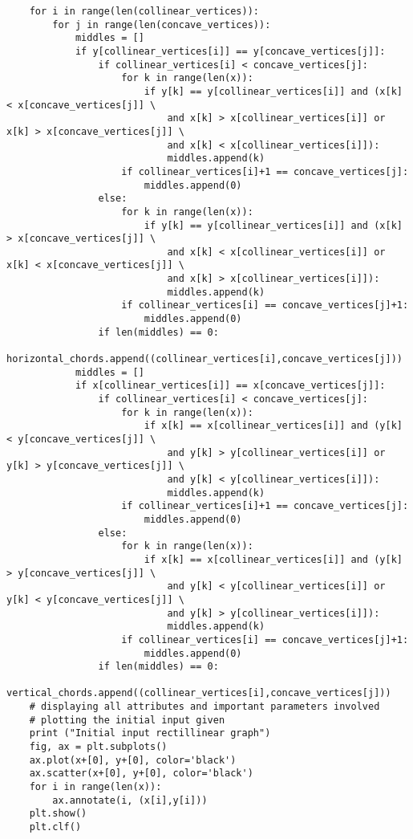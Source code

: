 \begin{lstlisting}
    for i in range(len(collinear_vertices)):
        for j in range(len(concave_vertices)):
            middles = []
            if y[collinear_vertices[i]] == y[concave_vertices[j]]:
                if collinear_vertices[i] < concave_vertices[j]:
                    for k in range(len(x)):
                        if y[k] == y[collinear_vertices[i]] and (x[k] < x[concave_vertices[j]] \
                            and x[k] > x[collinear_vertices[i]] or x[k] > x[concave_vertices[j]] \
                            and x[k] < x[collinear_vertices[i]]):
                            middles.append(k)
                    if collinear_vertices[i]+1 == concave_vertices[j]:
                        middles.append(0)
                else:
                    for k in range(len(x)):
                        if y[k] == y[collinear_vertices[i]] and (x[k] > x[concave_vertices[j]] \
                            and x[k] < x[collinear_vertices[i]] or x[k] < x[concave_vertices[j]] \
                            and x[k] > x[collinear_vertices[i]]):
                            middles.append(k)
                    if collinear_vertices[i] == concave_vertices[j]+1:
                        middles.append(0)
                if len(middles) == 0:
                    horizontal_chords.append((collinear_vertices[i],concave_vertices[j]))
            middles = []
            if x[collinear_vertices[i]] == x[concave_vertices[j]]:
                if collinear_vertices[i] < concave_vertices[j]:
                    for k in range(len(x)):
                        if x[k] == x[collinear_vertices[i]] and (y[k] < y[concave_vertices[j]] \
                            and y[k] > y[collinear_vertices[i]] or y[k] > y[concave_vertices[j]] \
                            and y[k] < y[collinear_vertices[i]]):
                            middles.append(k)
                    if collinear_vertices[i]+1 == concave_vertices[j]:
                        middles.append(0)
                else:
                    for k in range(len(x)):
                        if x[k] == x[collinear_vertices[i]] and (y[k] > y[concave_vertices[j]] \
                            and y[k] < y[collinear_vertices[i]] or y[k] < y[concave_vertices[j]] \
                            and y[k] > y[collinear_vertices[i]]):
                            middles.append(k)
                    if collinear_vertices[i] == concave_vertices[j]+1:
                        middles.append(0)
                if len(middles) == 0:
                    vertical_chords.append((collinear_vertices[i],concave_vertices[j]))    
    # displaying all attributes and important parameters involved
    # plotting the initial input given
    print ("Initial input rectillinear graph")
    fig, ax = plt.subplots()
    ax.plot(x+[0], y+[0], color='black')
    ax.scatter(x+[0], y+[0], color='black')
    for i in range(len(x)):
        ax.annotate(i, (x[i],y[i]))
    plt.show()
    plt.clf()
    

\end{lstlisting}
